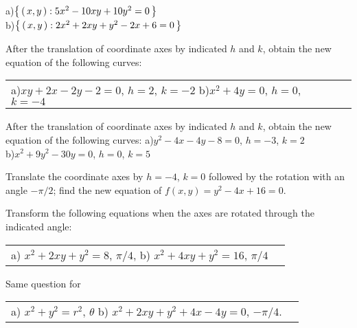 \documentclass{book}
\begin{document}



\begin{exercise}
    a)$ \left \{ \, 
    	 \left( \, x, y \, \right)  : 5x^2 - 10xy + 10y^2 = 0
     \, \right \} $\\
    b)$ \left \{ \, 
       	 \left( \, x, y \, \right)  : 2x^2 + 2xy + y^2 - 2x + 6 = 0
     \, \right \} $
\end{exercise}

\begin{exercise}
After the translation of coordinate axes by indicated $h$ and $k$, obtain the new equation of the following curves:
\begin{center}
\begin{tabular}{ll}
a)$ xy + 2x -2y - 2 = 0 $, $ h = 2 $, $ k = -2 $  \quad \quad 
b)$ x^2 + 4y = 0 $, $ h = 0 $, $ k = -4 $
\end{tabular}
\end{center}
\end{exercise}

\begin{exercise}
After the translation of coordinate axes by indicated $h$ and $k$, obtain the new equation of the following curves: 
a)$ y^2 - 4x - 4y - 8 = 0 $, $ h = -3 $, $ k = 2 $\\
b)$x^2 + 9y^2 - 30y = 0 $, $ h = 0 $, $ k = 5 $
\end{exercise}

\begin{exercise}
Translate the coordinate axes by $ h = -4 $, $ k = 0 $ followed by the rotation with an angle $ -\pi / 2 $; find the new equation of $ f(x,y) = y^2 - 4x + 16 = 0 $.
\end{exercise}

\begin{exercise}
Transform the following equations when the axes are rotated through the indicated angle:
\begin{center}
\begin{tabular}{ll}
a)   $ x^2 + 2xy + y^2 = 8 $, $ \pi / 4 $, \quad \quad 
b) $ x^2 + 4xy + y^2 = 16 $, $ \pi / 4 $
\end{tabular}
\end{center}
\end{exercise}

\begin{exercise}
Same question for
\begin{center}
\begin{tabular}{ll}
a) $ x^2 + y^2 = r^2 $, $ \theta $ \quad \quad 
b)   $ x^2 + 2xy + y^2 +4x -4y = 0 $, $ -\pi / 4 $.
\end{tabular}
\end{center}
\end{exercise}
\end{document}
